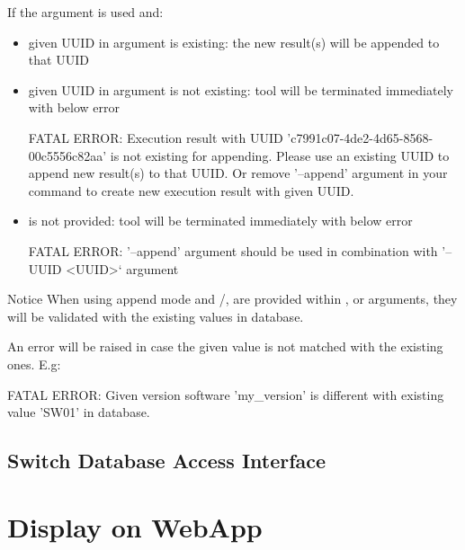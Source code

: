     If the argument  is used and:
    \begin{itemize}
      \item given UUID in  argument is existing:
            the new result(s) will be appended to that UUID
      \item given UUID in  argument is not existing:
            tool will be terminated immediately with below error
\begin{robotlog}
FATAL ERROR: Execution result with UUID 'c7991c07-4de2-4d65-8568-00c5556c82aa' is not existing for appending.
             Please use an existing UUID to append new result(s) to that UUID.
             Or remove '--append' argument in your command to create new execution result with given UUID.
\end{robotlog}
      \item {} is not provided:
            tool will be terminated immediately with below error
\begin{robotlog}
FATAL ERROR: '--append' argument should be used in combination with '--UUID <UUID>` argument
\end{robotlog}
    \end{itemize}

    \begin{boxhint} {Notice}
      When using append mode and /,
       are provided within ,
       or  arguments, they will
      be validated with the existing values in database.

      An error will be raised in case the given value is not matched with the
      existing ones. E.g:
\begin{robotlog}
FATAL ERROR: Given version software 'my_version' is different with existing value 'SW01' in database.
\end{robotlog}
    \end{boxhint}

  \subsection{Switch Database Access Interface}
  
\newpage
\hypertarget{description-display-on-webapp}{%
\section{Display on WebApp}\label{description-display-on-webapp}}

